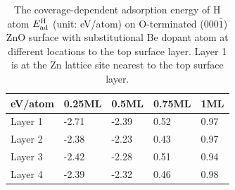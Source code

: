 \begin{table}[!htbp]
\centering
\caption[Comparison of different doping locations to the top surface layer]{The coverage-dependent adsorption energy of H atom $E_{\textup{ad}}^{\textup{H}}$ (unit: eV/atom) on O-terminated  (000$\bar{1}$) ZnO surface with substitutional Be dopant atom at different locations to the top surface layer. Layer 1 is at the Zn lattice site nearest to the top surface layer.}
\label{tab:layer}
\begin{tabular}{lllll}
\\
\hline
\hline
eV/atom      & 0.25ML & 0.5ML & 0.75ML & 1ML  \\ \hline
Layer 1      & -2.71  & -2.39 & 0.52   & 0.97 \\
Layer 2      & -2.38  & -2.23 & 0.43   & 0.97 \\
Layer 3      & -2.42  & -2.28 & 0.51   & 0.94 \\
Layer 4      & -2.39  & -2.32 & 0.46   & 0.98 \\
\hline
\hline
\end{tabular}
\end{table}

